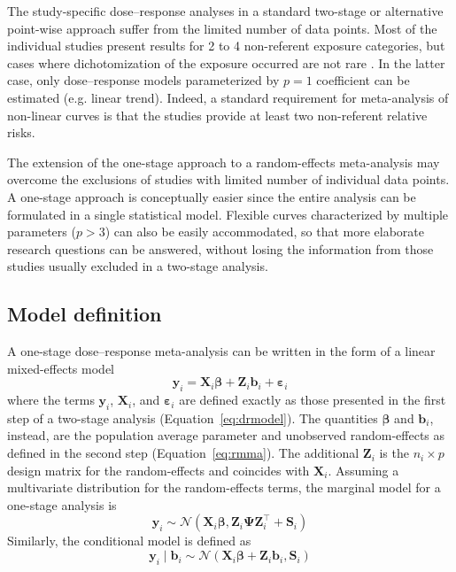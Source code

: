 \documentclass[11pt,a4paper,twoside,openany]{book}\usepackage{knitr}
\begin{document}
{{The study-specific dose--response analyses in a standard two-stage or alternative point-wise approach suffer from the limited number of data points. Most of the individual studies present results for 2 to 4 non-referent exposure categories, but cases where dichotomization of the exposure occurred are not rare \citep{turner2010categorisation}. In the latter case, only dose--response models parameterized by $p = 1$ coefficient can be estimated (e.g. linear trend). Indeed, a standard requirement for meta-analysis of non-linear curves is that the studies provide at least two non-referent relative risks.

The extension of the one-stage approach to a random-effects meta-analysis may overcome the exclusions of studies with limited number of individual data points. A one-stage approach is conceptually easier since the entire analysis can be formulated in a single statistical model. Flexible curves characterized by multiple parameters ($p > 3$) can also be easily accommodated, so that more elaborate research questions can be answered, without losing the information from those studies usually excluded in a two-stage analysis.

\subsection{Model definition}

A one-stage dose--response meta-analysis can be written in the form of a linear mixed-effects model
\begin{equation}
\mathbf{y}_{i} = \mathbf{X}_{i} \boldsymbol{\beta} + \mathbf{Z}_{i}  \mathbf{b}_i + \boldsymbol{\varepsilon}_{i}
\label{eq:onestage}
\end{equation}
\noindent where the terms $\mathbf{y}_{i}$, $\mathbf{X}_{i}$, and $\boldsymbol{\varepsilon}_{i}$ are defined exactly as those presented in the first step of a two-stage analysis (Equation~\ref{eq:drmodel}). The quantities $\boldsymbol{\beta}$ and $\mathbf{b}_i$, instead, are the population average parameter and unobserved random-effects as defined in the second step (Equation~\ref{eq:rmma}). The additional $\mathbf{Z}_{i}$ is the $n_i \times p$ design matrix for the random-effects and coincides with $\mathbf{X}_{i}$.
Assuming a multivariate distribution for the random-effects terms, the marginal model for a one-stage analysis is
\begin{equation}
\mathbf{y}_{i} \sim \mathcal{N} \left( \mathbf{X}_{i} \boldsymbol{\beta},  \mathbf{Z}_{i} \boldsymbol{\Psi} \mathbf{Z}_{i}^\top  + \mathbf{S}_i \right)
\label{eq:marginal_os}
\end{equation}
\noindent Similarly, the conditional model is defined as
\begin{equation}
\mathbf{y}_{i} \mid \boldsymbol{b}_i \sim \mathcal{N} \left( \mathbf{X}_{i} \boldsymbol{\beta} + \mathbf{Z}_{i} \boldsymbol{b}_i,  \mathbf{S}_i \right)
\label{eq:conditional_os}
\end{equation}

}}
\end{document}
